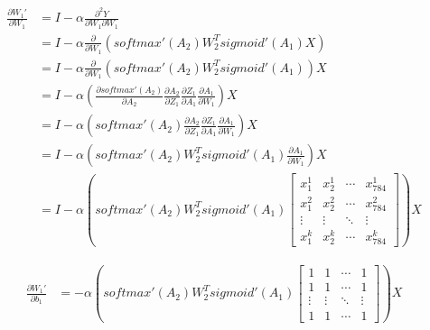\documentclass[12pt,a4paper]{amsart}
\begin{document}
\begin{equation}
	\begin{aligned}
		\frac{\partial {W_1}'}{\partial W_1} & = I - \alpha \frac{\partial^2 Y}{\partial W_1 \partial W_1}                                                                                                                     \\
		                                     & = I - \alpha \frac{\partial}{\partial W_1} \left( softmax'(A_2) W_2^T sigmoid'(A_1) X \right)                                                                                   \\
		                                     & = I - \alpha \frac{\partial}{\partial W_1} \left( softmax'(A_2) W_2^T sigmoid'(A_1) \right) X                                                                                   \\
		                                     & = I - \alpha \left( \frac{\partial softmax'(A_2)}{\partial A_2} \frac{\partial A_2}{\partial Z_1} \frac{\partial Z_1}{\partial A_1} \frac{\partial A_1}{\partial W_1} \right) X \\
		                                     & = I - \alpha \left( softmax'(A_2) \frac{\partial A_2}{\partial Z_1} \frac{\partial Z_1}{\partial A_1} \frac{\partial A_1}{\partial W_1} \right) X                               \\
		                                     & = I - \alpha \left( softmax'(A_2) W_2^T sigmoid'(A_1) \frac{\partial A_1}{\partial W_1} \right) X                                                                               \\
		                                     & = I - \alpha \left( softmax'(A_2) W_2^T sigmoid'(A_1) \begin{bmatrix}
			x_1^1  & x_2^1  & \cdots & x_{784}^1 \\
			x_1^2  & x_2^2  & \cdots & x_{784}^2 \\
			\vdots & \vdots & \ddots & \vdots    \\
			x_1^k  & x_2^k  & \cdots & x_{784}^k
		\end{bmatrix} \right) X
	\end{aligned}
\end{equation}

\begin{equation}
	\begin{aligned}
		\frac{\partial {W_1}'}{\partial b_1} & = - \alpha \left( softmax'(A_2) W_2^T sigmoid'(A_1) \begin{bmatrix}
			1      & 1      & \cdots & 1      \\
			1      & 1      & \cdots & 1      \\
			\vdots & \vdots & \ddots & \vdots \\
			1      & 1      & \cdots & 1
		\end{bmatrix} \right) X
	\end{aligned}
\end{equation}
\end{document}
